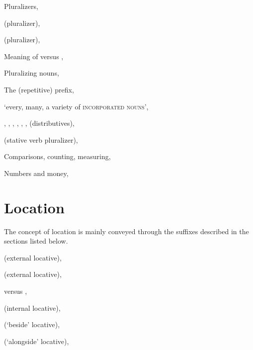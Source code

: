\begin{CayugaRelated}
\item{}Pluralizers, 

\item{} (pluralizer), 

\item{} (pluralizer), 

\item{}Meaning of  versus , 

\item{}Pluralizing nouns, 

\item{}The  (repetitive) prefix, 

\item{} ‘every, many, a variety of \textsc{incorporated nouns}’, 

\item{}, , , , , ,  (distributives), 

\item{} (stative verb pluralizer), 

\item{}Comparisons, counting, measuring, 

\item{}Numbers and money, 
\end{CayugaRelated}


\section{Location} \label{ch:Location}
The concept of location is mainly conveyed through the suffixes described in the sections listed below.

\begin{CayugaRelated}
\item{} (external locative), 

\item{} (external locative), 

\item{} versus , 

\item{} (internal locative), \sectref{[-gǫ:]}

\item{} (‘beside’ locative), \sectref{[-:kˀah]}

\item{} (‘alongside’ locative), \sectref{[-kdagyeˀ]}
\end{CayugaRelated}

